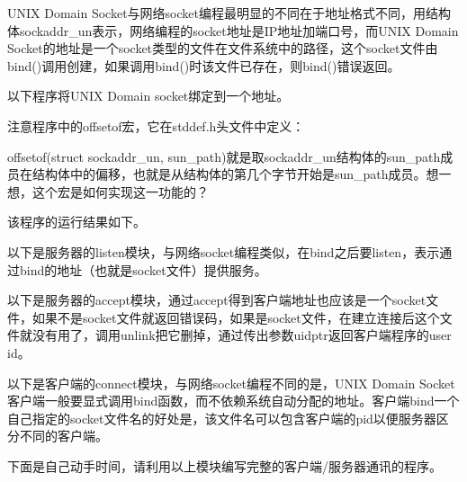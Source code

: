 UNIX Domain Socket与网络socket编程最明显的不同在于地址格式不同，用结构体sockaddr\_\BookSplit{}un表示，网络编程的socket地址是IP地址加端口号，而UNIX Domain Socket的地址是一个socket类型的文件在文件系统中的路径，这个socket文件由bind()调用创建，如果调用bind()时该文件已存在，则bind()错误返回。



以下程序将UNIX Domain socket绑定到一个地址。




注意程序中的offsetof宏，它在stddef.\BookSplit{}h头文件中定义：




offsetof(struct sockaddr\_\BookSplit{}un, sun\_\BookSplit{}path)就是取sockaddr\_\BookSplit{}un结构体的sun\_\BookSplit{}path成员在结构体中的偏移，也就是从结构体的第几个字节开始是sun\_\BookSplit{}path成员。想一想，这个宏是如何实现这一功能的？



该程序的运行结果如下。




以下是服务器的listen模块，与网络socket编程类似，在bind之后要listen，表示通过bind的地址（也就是socket文件）提供服务。




以下是服务器的accept模块，通过accept得到客户端地址也应该是一个socket文件，如果不是socket文件就返回错误码，如果是socket文件，在建立连接后这个文件就没有用了，调用unlink把它删掉，通过传出参数uidptr返回客户端程序的user id。




以下是客户端的connect模块，与网络socket编程不同的是，UNIX Domain Socket客户端一般要显式调用bind函数，而不依赖系统自动分配的地址。客户端bind一个自己指定的socket文件名的好处是，该文件名可以包含客户端的pid以便服务器区分不同的客户端。




下面是自己动手时间，请利用以上模块编写完整的客户端/服务器通讯的程序。




